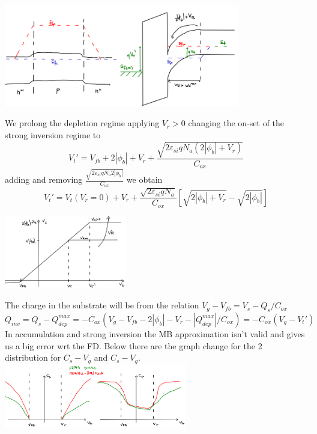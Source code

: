 \centering
\includegraphics[width=0.77\textwidth]{what3.png}\\
\raggedright
We prolong the depletion regime applying $V_r>0$ changing the on-set of the strong inversion regime to 
\begin{equation}
V_t'=V_{fb}+2|\phi_b|+V_r+\frac{\sqrt{2\varepsilon_{si}qN_a(2|\phi_b|+V_r)}}{C_{ox}}
\end{equation}
adding and removing $\frac{\sqrt{2\varepsilon_{si}qN_a2|\phi_b|}}{C_{ox}}$ we obtain
\begin{equation}
V_t'=V_t(V_r=0)+V_r+\frac{\sqrt{2\varepsilon_{si}qN_a}}{C_{ox}}[\sqrt{2|\phi_b|+V_r}-\sqrt{2|\phi_b|}]
\end{equation}

\centering
\includegraphics[width=0.4\textwidth]{vtprimo.png}\\
\raggedright

The charge in the substrate will be from the relation $V_g-V_{fb}=V_s-Q_s/C_{ox}$ 
\begin{equation}
Q_{inv}=Q_s-Q_{dep}^{max}=-C_{ox}(V_g-V_{fb}-2|\phi_b|-V_r-|Q_{dep}^{max}|/C_{ox})=-C_{ox}(V_g-V_t')
\end{equation}
In accumulation and strong inversion the MB approximation isn't valid and gives us a big error wrt the FD. Below there are the graph change for the 2 distribution for $C_s-V_g$ and $C_s-V_g$.\\

\centering
\includegraphics[width=0.6\textwidth]{mbvsfdmos.png}\\
\raggedright

